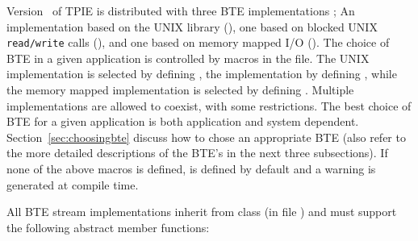 \begin{comment}
 The BTEs will not, however, be responsible for coordinating the
actions of multiple CPU's and the disks attached to them. In such cases, a
separate instance of a BTE will run on each such CPU, and their actions
will be coordinated by a single multi-threaded MM running at a higher
level. The reason for the functional split between the two levels is that
it will likely be advantageous to be able to use a single BTE written for a
specific piece of hardware with more than one MM, for example, one MM
written for a homogeneous environment and one for a heterogeneous
environment. 
\end{comment}

Version \version~of TPIE is distributed with three BTE implementations ; An
implementation based on the UNIX  library (),
one based on blocked UNIX {\tt read/write} calls 
(), and one based on memory mapped I/O (). The
choice of BTE in a given application is controlled by macros in the
 file.  The UNIX  implementation is selected
by defining , the  implementation by
defining , while the memory mapped implementation is
selected by defining . Multiple implementations are
allowed to coexist, with some restrictions. The best choice of BTE for a given application is both
application and system dependent. Section~\ref{sec:choosingbte} discuss how
to chose an appropriate BTE (also refer to the more detailed descriptions
of the BTE's in the next three subsections). If none of the above macros is
defined,  is defined by default and a warning is
generated at compile time.

All BTE stream implementations inherit from class 
(in file ) and must support the following abstract
member functions:

